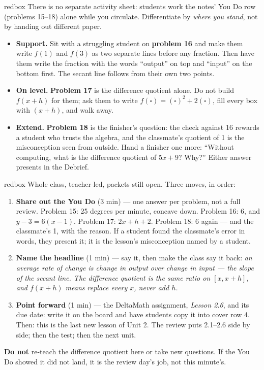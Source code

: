 \documentclass[10pt]{article}
\begin{document}
\begin{skillbox}{redbox}
There is no separate activity sheet: students work the notes' You Do row (problems 15--18)
alone while you circulate. Differentiate by \textit{where you stand}, not by handing out
different paper.

\begin{itemize}
  \item \textbf{Support.} Sit with a struggling student on \textbf{problem 16} and make them
        write $f(1)$ and $f(3)$ as two separate lines before any fraction. Then have them
        write the fraction with the words ``output'' on top and ``input'' on the bottom
        first. The secant line follows from their own two points.
  \item \textbf{On level.} \textbf{Problem 17} is the difference quotient alone. Do not build
        $f(x + h)$ for them; ask them to write $f(\square) = (\square)^2 + 2(\square)$, fill
        every box with $(x + h)$, and walk away.
  \item \textbf{Extend.} \textbf{Problem 18} is the finisher's question: the check against 16
        rewards a student who trusts the algebra, and the classmate's quotient of 1 is the
        misconception seen from outside. Hand a finisher one more: ``Without computing, what
        is the difference quotient of $5x + 9$? Why?'' Either answer presents in the Debrief.
\end{itemize}
\end{skillbox}

\boxguard[20]
\begin{skillbox}{redbox}
Whole class, teacher-led, packets still open. Three moves, in order:
\begin{enumerate}[itemsep=3pt]
  \item \textbf{Share out the You Do} (3 min) --- one answer per problem, not a full review.
        Problem 15: 25 degrees per minute, concave down. Problem 16: 6, and
        $y - 3 = 6(x - 1)$. Problem 17: $2x + h + 2$. Problem 18: 6 again --- and the
        classmate's 1, with the reason. If a student found the classmate's error in words,
        they present it; it is the lesson's misconception named by a student.
  \item \textbf{Name the headline} (1 min) --- say it, then make the class say it back:
        \textit{an average rate of change is change in output over change in input --- the
        slope of the secant line. The difference quotient is the same ratio on $[x, x + h]$,
        and $f(x + h)$ means replace every $x$, never add $h$.}
  \item \textbf{Point forward} (1 min) --- the DeltaMath assignment, \textit{Lesson 2.6}, and
        its due date: write it on the board and have students copy it into cover row 4. Then:
        this is the last new lesson of Unit 2. The review puts 2.1--2.6 side by side; then the
        test; then the next unit.
\end{enumerate}
\textbf{Do not} re-teach the difference quotient here or take new questions. If the You Do
showed it did not land, it is the review day's job, not this minute's.
\end{skillbox}
\end{document}
